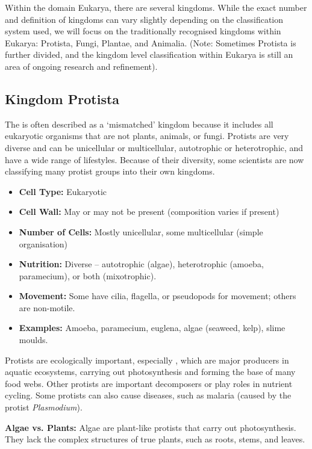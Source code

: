 \FloatBarrier
\1

Within the domain Eukarya, there are several kingdoms.  While the exact number and definition of kingdoms can vary slightly depending on the classification system used, we will focus on the traditionally recognised kingdoms within Eukarya: Protista, Fungi, Plantae, and Animalia.  (Note: Sometimes Protista is further divided, and the kingdom level classification within Eukarya is still an area of ongoing research and refinement).

\subsection{Kingdom Protista}

The  is often described as a ‘mismatched’ kingdom because it includes all eukaryotic organisms that are not plants, animals, or fungi. Protists are very diverse and can be unicellular or multicellular, autotrophic or heterotrophic, and have a wide range of lifestyles.  Because of their diversity, some scientists are now classifying many protist groups into their own kingdoms.

\begin{itemize}
    \item \textbf{Cell Type:} Eukaryotic
    \item \textbf{Cell Wall:} May or may not be present (composition varies if present)
    \item \textbf{Number of Cells:} Mostly unicellular, some multicellular (simple organisation)
    \item \textbf{Nutrition:}  Diverse – autotrophic (algae), heterotrophic (amoeba, paramecium), or both (mixotrophic).
    \item \textbf{Movement:}  Some have cilia, flagella, or pseudopods for movement; others are non-motile.
    \item \textbf{Examples:} Amoeba, paramecium, euglena, algae (seaweed, kelp), slime moulds.
\end{itemize}

Protists are ecologically important, especially , which are major producers in aquatic ecosystems, carrying out photosynthesis and forming the base of many food webs.  Other protists are important decomposers or play roles in nutrient cycling. Some protists can also cause diseases, such as malaria (caused by the protist \textit{Plasmodium}).

\begin{marginnote}
\textbf{Algae vs. Plants:} Algae are plant-like protists that carry out photosynthesis.  They lack the complex structures of true plants, such as roots, stems, and leaves.
\end{marginnote}

